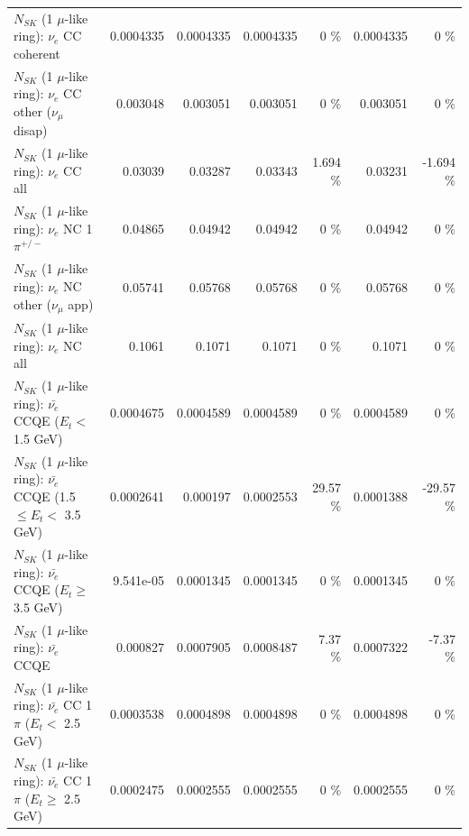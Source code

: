 \begin{table}
\begin{tabular}{| l | r | r | r  r | r  r |}
                               $N_{SK}$ (1 $\mu$-like ring): $\nu_e$ CC coherent &       0.0004335 &       0.0004335 &       0.0004335 &        0 \%  &       0.0004335 &        0 \%  \\ 
                $N_{SK}$ (1 $\mu$-like ring): $\nu_e$ CC other ($\nu_\mu$ disap) &        0.003048 &        0.003051 &        0.003051 &        0 \%  &        0.003051 &        0 \%  \\ 
                                  $N_{SK}$ (1 $\mu$-like ring): $\nu_{e}$ CC all &         0.03039 &         0.03287 &         0.03343 &    1.694 \%  &         0.03231 &   -1.694 \%  \\ 
\hline
                           $N_{SK}$ (1 $\mu$-like ring): $\nu_e$ NC 1$\pi^{+/-}$ &         0.04865 &         0.04942 &         0.04942 &        0 \%  &         0.04942 &        0 \%  \\ 
                  $N_{SK}$ (1 $\mu$-like ring): $\nu_e$ NC other ($\nu_\mu$ app) &         0.05741 &         0.05768 &         0.05768 &        0 \%  &         0.05768 &        0 \%  \\ 
                                  $N_{SK}$ (1 $\mu$-like ring): $\nu_{e}$ NC all &          0.1061 &          0.1071 &          0.1071 &        0 \%  &          0.1071 &        0 \%  \\ 
\hline
\hline
\hline
            $N_{SK}$ (1 $\mu$-like ring): $\bar{\nu_e}$ CCQE ($E_{t} <$ 1.5 GeV) &       0.0004675 &       0.0004589 &       0.0004589 &        0 \%  &       0.0004589 &        0 \%  \\ 
   $N_{SK}$ (1 $\mu$-like ring): $\bar{\nu_e}$ CCQE (1.5 $\leq E_{t} <$ 3.5 GeV) &       0.0002641 &        0.000197 &       0.0002553 &    29.57 \%  &       0.0001388 &   -29.57 \%  \\ 
         $N_{SK}$ (1 $\mu$-like ring): $\bar{\nu_e}$ CCQE ($E_{t} \geq$ 3.5 GeV) &       9.541e-05 &       0.0001345 &       0.0001345 &        0 \%  &       0.0001345 &        0 \%  \\ 
\hline
                                $N_{SK}$ (1 $\mu$-like ring): $\bar{\nu_e}$ CCQE &        0.000827 &       0.0007905 &       0.0008487 &     7.37 \%  &       0.0007322 &    -7.37 \%  \\ 
\hline
       $N_{SK}$ (1 $\mu$-like ring): $\bar{\nu_e}$ CC 1$\pi$ ($E_{t} <$ 2.5 GeV) &       0.0003538 &       0.0004898 &       0.0004898 &        0 \%  &       0.0004898 &        0 \%  \\ 
    $N_{SK}$ (1 $\mu$-like ring): $\bar{\nu_e}$ CC 1$\pi$ ($E_{t} \geq$ 2.5 GeV) &       0.0002475 &       0.0002555 &       0.0002555 &        0 \%  &       0.0002555 &        0 \%  \\ 

\end{tabular}
\end{table}
